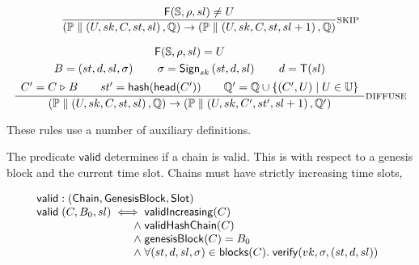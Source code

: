 \documentclass[12pt]{article}
\newcommand{\sExtend}{\mathrel{\triangleright}}
\newcommand{\where}{\mathrel{|}}
\newcommand{\fun}[1]{\mathsf{#1}}
\newcommand{\type}[1]{\mathsf{#1}}
\newcommand{\sPar}{\mathrel{\parallel}}
\newcommand{\sSystem}[2]{\left( #1, #2 \right)}
\newcommand{\sProcess}[3]{\left( U, sk, #1, #2, #3 \right)}
\newcommand{\sChain}{C}
\newcommand{\sState}{st}
\newcommand{\sSlot}{sl}
\newcommand{\sLeader}{\mathsf{F}}
\newcommand{\sQueue}{\mathbb{Q}}
\newcommand{\sProcesses}{\mathbb{P}}
\newcommand{\sBlock}[4]{\left( #1 , #2 , #3 , #4 \right)}
\newcommand{\sHead}{\mathsf{head}}
\newcommand{\sSign}[4]{\mathsf{Sign}_{#1}\left(#2, #3, #4\right)}
\begin{document}
\begin{equation*}
\frac{
    \sLeader(\mathbb{S}, \rho, sl) \neq U
}{
  \sSystem{\sProcesses \sPar \sProcess{\sChain}{\sState}{\sSlot}}{\sQueue}
\rightarrow
  \sSystem{\sProcesses \sPar \sProcess{\sChain}{\sState}{\sSlot+1}}{\sQueue}
} \textsc{skip}
\end{equation*}

\bigskip

\begin{equation*}
\frac{
    \begin{array}{c}
    \sLeader(\mathbb{S}, \rho, sl) = U
    \\[1mm]
    B = \sBlock{\sState}{d}{\sSlot}{\sigma}
    \qquad
    \sigma = \sSign{sk}{\sState}{d}{\sSlot}
    \qquad
    d = \mathsf{T}(\sSlot)
    \\[1.5mm]
    \sChain' = \sChain \sExtend B
    \qquad
    \sState' = \fun{hash}(\sHead(\sChain'))
    \qquad
    \sQueue' = \sQueue \cup \{ (\sChain', U) \where U \in \mathbb{U} \}
    \end{array}
}{
  \sSystem{\sProcesses \sPar \sProcess{\sChain}{\sState}{\sSlot}}{\sQueue}
\rightarrow
  \sSystem{\sProcesses \sPar \sProcess{\sChain'}{\sState'}{\sSlot+1}}{\sQueue'}
} \textsc{diffuse}
\end{equation*}

\bigskip

These rules use a number of auxiliary definitions.

The predicate $\fun{valid}$ determines if a chain is valid. This is with
respect to a genesis block and the current time slot. Chains must have strictly
increasing time slots, 

\begin{equation*}
\begin{array}{l}
\fun{valid} : (\type{Chain}, \type{GenesisBlock}, \type{Slot})
\\
\begin{array}{@{}r@{\;}r@{\;}l}
\fun{valid} \; (\sChain, B_0, sl)
  & \iff  & \mathsf{validIncreasing}(\sChain) \\
  & \land & \mathsf{validHashChain}(\sChain)  \\
  & \land & \mathsf{genesisBlock}(\sChain) = B_0 \\
  & \land & \forall (st, d, sl, \sigma) \in \mathsf{blocks}(\sChain). \;
             \fun{verify}(vk, \sigma, (st, d, sl)) \\
\end{array}
\end{array}
\end{equation*}
\end{document}
